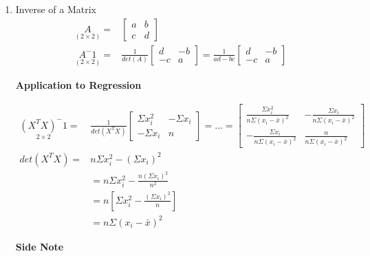 \documentclass[11pt]{article}
\begin{document}
\begin{enumerate}
\item Inverse of a Matrix
\label{sec:orgc5db48d}
\begin{equation}
\begin{split}
\underset{(2 \times 2)}{A} = &\begin{bmatrix}
a & b\\
c & d
\end{bmatrix}\\
\underset{(2 \times 2)}{A^-1} = & \frac{1}{det(A)} \begin{bmatrix}
d & -b\\
-c & a
\end{bmatrix} = \frac{1}{ad - bc} \begin{bmatrix}
d & -b\\
-c & a
\end{bmatrix}
\end{split}
\end{equation}

\textbf{Application to Regression}

\begin{equation}
\begin{split}
\underset{2 \times 2}{(X^T X)^-1} = & \frac{1}{det(X^T X)} \begin{bmatrix}
\Sigma x_i^2 & - \Sigma x_i\\
- \Sigma x_i & n
\end{bmatrix} = ... = \begin{bmatrix}
\frac{\Sigma x_i^2}{n \Sigma (x_i - \bar{x})^2} & - \frac{\Sigma x_i}{n \Sigma (x_i - \bar{x})^2}\\
- \frac{\Sigma x_i}{n \Sigma (x_i - \bar{x})^2} & \frac{n}{n \Sigma (x_i - \bar{x})^2}
\end{bmatrix}\\
det(X^T X) = & n \Sigma x_i^2 - (\Sigma x_i)^2\\
& = n \Sigma x_i^2 - \frac{n (\Sigma x_i)^2}{n^2}\\
& = n [ \Sigma x_i^2 - \frac{(\Sigma x_i)^2}{n}]\\
& = n \Sigma (x_i - \bar{x})^2
\end{split}
\end{equation}

\textbf{Side Note}


\end{enumerate}
\end{document}
